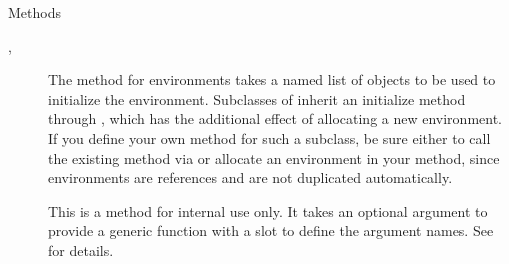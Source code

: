 \begin{Section}{Methods}
\begin{description}
\item[, ] 
The  method for environments takes a named list
of objects to be used to initialize the environment.  Subclasses
of  inherit an initialize method through
, which has the additional effect of
allocating a new environment.  If you define your own method for
such a subclass, be sure either to call the existing method via
 or allocate an environment in your
method, since environments are references and are not duplicated
automatically.


\item[] 
This is a method for internal use only.
It takes an optional  argument to provide a
generic function with a  slot to define the
argument names.  See  for details.


\end{description}

\end{Section}
%
